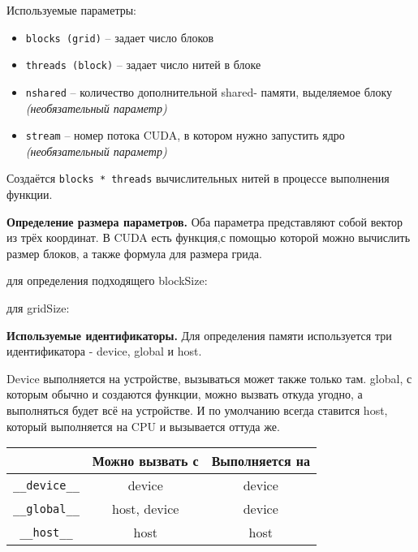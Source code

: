 Используемые параметры:
\begin{itemize}
    \item\texttt{blocks (grid)} -- задает число блоков
    \item\texttt{threads (block)} -- задает число нитей в блоке
    \item\texttt{nshared} -- количество дополнительной shared- памяти, выделяемое блоку \textit{(необязательный параметр)}
    \item\texttt{stream} -- номер потока CUDA, в котором нужно запустить ядро \textit{(необязательный параметр)}
\end{itemize}

Создаётся \texttt{blocks * threads} вычислительных нитей в процессе выполнения функции.

\textbf{Определение размера параметров.} Оба параметра представляют собой вектор из трёх координат. В CUDA есть функция,с помощью которой можно вычислить размер блоков, а также формула для размера грида.

 для определения подходящего blockSize:

 для gridSize:

\textbf{Используемые идентификаторы.} Для определения памяти используется три идентификатора - device, global и host.

Device выполняется на устройстве, вызываться может также только там. global, с которым обычно и создаются функции, можно вызвать откуда угодно, а выполняться будет всё на устройстве. И по умолчанию всегда ставится host, который выполняется на CPU и вызывается оттуда же.

\begin{table}[H]
    \begin{tabularx}{\textwidth}{|c|C|C|}
    \hline
                    & \textbf{Можно вызвать с}   & \textbf{Выполняется на}     \\ \hline
    \texttt{\_\_device\_\_}  & device            & device         \\ \hline
    \texttt{\_\_global\_\_}  & host, device      & device         \\ \hline
    \texttt{\_\_host\_\_}    & host              & host           \\ \hline
    \end{tabularx}
\end{table}

